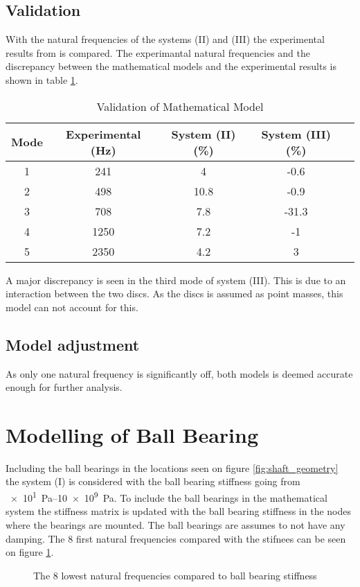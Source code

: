\subsection{Validation}
With the natural frequencies of the systems (II) and (III) the experimental results from \cite[6]{Problem} is compared. The experimantal natural frequencies and the discrepancy between the mathematical models and the experimental results is shown in table \ref{tab:validation_two_discs}.
\begin{table}[htbp]
    \begin{adjustwidth}{-1cm}{-1cm}
    \centering
    \caption{Validation of Mathematical Model}
    \label{tab:validation_two_discs}
    \begin{tabular}{@{}ccccc@{}}
        \toprule
        Mode    &   Experimental (\si{\hertz})    &   System (II) (\si{\percent})    &   System (III) (\si{\percent})  \\ \midrule
        1       &   241     &   4       &   -0.6    \\
        2       &   498     &   10.8    &   -0.9    \\
        3       &   708     &   7.8     &   -31.3   \\
        4       &   1250    &   7.2     &   -1      \\ 
        5       &   2350    &   4.2     &   3       \\ \bottomrule
    \end{tabular}
    \end{adjustwidth}
\end{table}

A major discrepancy is seen in the third mode of system (III). This is due to an interaction between the two discs. As the discs is assumed as point masses, this model can not account for this.

\subsection{Model adjustment}
As only one natural frequency is significantly off, both models is deemed accurate enough for further analysis.

\section{Modelling of Ball Bearing}
Including the ball bearings in the locations seen on figure \ref{fig:shaft_geometry} the system (I) is considered with the ball bearing stiffness going from \SIrange{e1}{10e9}{\pascal}.
To include the ball bearings in the mathematical system the stiffness matrix is updated with the ball bearing stiffness in the nodes where the bearings are mounted. The ball bearings are assumes to not have any damping.
The 8 first natural frequencies compared with the stifnees can be seen on figure \ref{fig:ball_bearing_stiffness}.
\begin{figure}[htbp]
    \centering
    
    \caption{The 8 lowest natural frequencies compared to ball bearing stiffness}
    \label{fig:ball_bearing_stiffness}
\end{figure}

